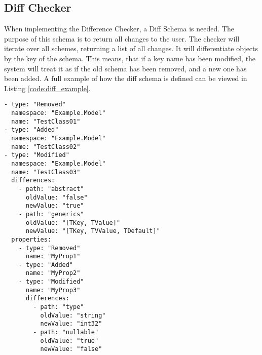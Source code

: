 \subsection{Diff Checker}
When implementing the Difference Checker, a Diff Schema is needed. 
The purpose of this schema is to return all changes to the user. 
The checker will iterate over all schemes, returning a list of all changes.
It will differentiate objects by the key of the schema. This means, that if a key name has been modified, the system will treat it as if the old schema has been removed, and a new one has been added.
A full example of how the diff schema is defined can be viewed in Listing \ref{code:diff_example}.
\begin{lstlisting}[caption={Diff schema example}, label={code:diff_example}, style=yaml]
- type: "Removed"
  namespace: "Example.Model"
  name: "TestClass01"
- type: "Added"
  namespace: "Example.Model"
  name: "TestClass02"
- type: "Modified"
  namespace: "Example.Model"
  name: "TestClass03"
  differences:
    - path: "abstract"
      oldValue: "false"
      newValue: "true"
    - path: "generics"
      oldValue: "[TKey, TValue]"
      newValue: "[TKey, TVValue, TDefault]"
  properties:
    - type: "Removed"
      name: "MyProp1"
    - type: "Added"
      name: "MyProp2"
    - type: "Modified"
      name: "MyProp3"
      differences:
        - path: "type"
          oldValue: "string"
          newValue: "int32"
        - path: "nullable"
          oldValue: "true"
          newValue: "false"
\end{lstlisting}